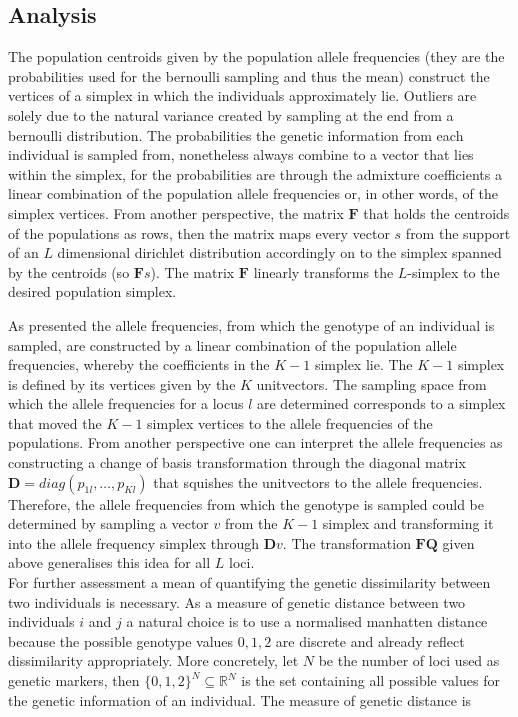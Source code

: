 \documentclass[a4paper, 11pt]{article}
\begin{document}
\subsection{Analysis}
The population centroids given by the population allele frequencies (they are the probabilities used for the bernoulli sampling and thus the mean) construct the vertices of a simplex in which the individuals approximately lie. Outliers are solely due to the natural variance created by sampling at the end from a bernoulli distribution. The probabilities the genetic information from each individual is sampled from, nonetheless always combine to a vector that lies within the simplex, for the probabilities are through the admixture coefficients a linear combination of the population allele frequencies or, in other words, of the simplex vertices. From another perspective, the matrix $\mathbf{F}$ that holds the centroids of the populations as rows, then the matrix maps every vector $s$ from the support of an $L$ dimensional dirichlet distribution accordingly on to the simplex spanned by the centroids (so $\mathbf{F}s$). The matrix $\mathbf{F}$ linearly transforms the $L$-simplex to the desired population simplex.

As presented the allele frequencies, from which the genotype of an individual is sampled, are constructed by a linear combination of the population allele frequencies, whereby the coefficients in the $K-1$ simplex lie. The $K-1$ simplex is defined by its vertices given by the $K$ unitvectors. The sampling space from which the allele frequencies for a locus $l$ are determined corresponds to a simplex that moved the $K-1$ simplex vertices to the allele frequencies of the populations. From another perspective one can interpret the allele frequencies as constructing a change of basis transformation through the diagonal matrix $\mathbf{D} = diag(p_{1l}, \ldots, p_{Kl})$ that squishes the unitvectors to the allele frequencies. Therefore, the allele frequencies from which the genotype is sampled could be determined by sampling a vector $v$ from the $K-1$ simplex and transforming it into the allele frequency simplex through $\mathbf{D}v$.  The transformation $\mathbf{F}\mathbf{Q}$ given above generalises this idea for all $L$ loci.\\

For further assessment a mean of quantifying the genetic dissimilarity between two individuals is necessary. As a measure of genetic distance between two individuals $i$ and $j$ a natural choice is to use a normalised manhatten distance because the possible genotype values ${0, 1, 2}$ are discrete and already reflect dissimilarity appropriately. More concretely, let $N$ be the number of loci used as genetic markers, then $\{0,1,2\}^N \subseteq \mathbb{R}^N$  is the set containing all possible values for the genetic information of an individual. The measure of genetic distance is 
\end{document}
